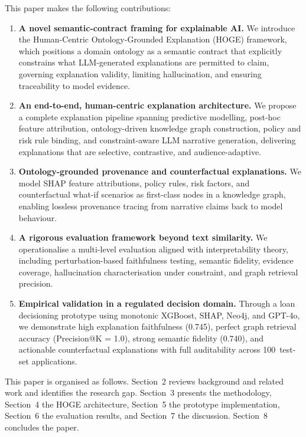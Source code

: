 \documentclass[lnbip]{svmultln}
\begin{document}
This paper makes the following contributions:
\begin{enumerate}
    \item \textbf{A novel semantic-contract framing for explainable AI.}
    We introduce the Human-Centric Ontology-Grounded Explanation (HOGE) framework, which positions a domain ontology as a semantic contract that explicitly constrains what LLM-generated explanations are permitted to claim, governing explanation validity, limiting hallucination, and ensuring traceability to model evidence.

    \item \textbf{An end-to-end, human-centric explanation architecture.}
    We propose a complete explanation pipeline spanning predictive modelling, post-hoc feature attribution, ontology-driven knowledge graph construction, policy and risk rule binding, and constraint-aware LLM narrative generation, delivering explanations that are selective, contrastive, and audience-adaptive.

    \item \textbf{Ontology-grounded provenance and counterfactual explanations.}
    We model SHAP feature attributions, policy rules, risk factors, and counterfactual what-if scenarios as first-class nodes in a knowledge graph, enabling lossless provenance tracing from narrative claims back to model behaviour.

    \item \textbf{A rigorous evaluation framework beyond text similarity.}
    We operationalise a multi-level evaluation aligned with interpretability theory, including perturbation-based faithfulness testing, semantic fidelity, evidence coverage, hallucination characterisation under constraint, and graph retrieval precision.

    \item \textbf{Empirical validation in a regulated decision domain.}
    Through a loan decisioning prototype using monotonic XGBoost, SHAP, Neo4j, and GPT-4o, we demonstrate high explanation faithfulness (0.745), perfect graph retrieval accuracy (Precision@K = 1.0), strong semantic fidelity (0.740), and actionable counterfactual explanations with full auditability across 100~test-set applications.
\end{enumerate}

This paper is organised as follows. Section~2 reviews background and related work and identifies the research gap. Section~3 presents the methodology, Section~4 the HOGE architecture, Section~5 the prototype implementation, Section~6 the evaluation results, and Section~7 the discussion. Section~8 concludes the paper.
\end{document}
